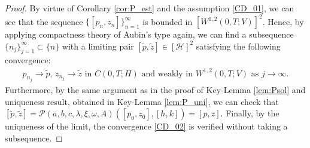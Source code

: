 \documentclass{sinst}
\numberwithin{equation}{section}
\theoremstyle{plain}
\theoremstyle{definition}
\def\sH{\mathscr{H}}
\def\sP{\mathscr{P}}
\begin{document}
\begin{proof}
  By virtue of Corollary \ref{cor:P_est} and the assumption \eqref{CD_01}, we can see that the sequence $\{ [p_n, z_n] \}_{n=1}^\infty$ is bounded in $[W^{1,2}(0,T;V)]^2$. Hence, by applying compactness theory of Aubin's type again, we can find a subsequence $\{ n_j \}_{j=1}^\infty \subset \{ n \}$ with a limiting pair $[\tilde p, \tilde z] \in [\sH]^2$ satisfying the following convergence:
  \begin{gather}
    p_{n_j} \to \tilde p, \, z_{n_j} \to \tilde z \mbox{ in } C(0,T;H) \mbox{ and weakly in } W^{1,2}(0,T;V) \mbox{ as } j \to \infty.
  \end{gather}
  Furthermore, by the same argument as in the proof of Key-Lemma \ref{lem:Psol} and uniqueness result, obtained in Key-Lemma \ref{lem:P_uni}, we can check that $[\tilde p, \tilde z] = \sP(a,b,c,\lambda,\xi,\omega,A)([p_0,z_0],[h,k]) = [p,z]$. Finally, by the uniqueness of the limit, the convergence \eqref{CD_02} is verified without taking a subsequence. 
  

\end{proof}
\end{document}
